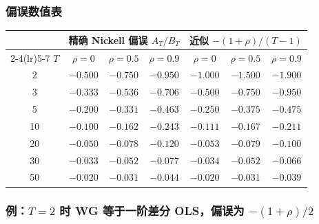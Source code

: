 \subsubsection{偏误数值表}

\begin{center}
\begin{minipage}{\linewidth}\centering\small
{}\label{tab:U12a-nickell}
\begin{tabular}{c@{\qquad}ccc@{\qquad}ccc}
\toprule
 & \multicolumn{3}{c}{精确 Nickell 偏误 $A_T/B_T$} & \multicolumn{3}{c}{近似 $-(1+\rho)/(T-1)$}\\
\cmidrule(lr){2-4}\cmidrule(lr){5-7}
$T$ & $\rho=0$ & $\rho=0.5$ & $\rho=0.9$ & $\rho=0$ & $\rho=0.5$ & $\rho=0.9$\\
\midrule
2  & $-0.500$ & $-0.750$ & $-0.950$ & $-1.000$ & $-1.500$ & $-1.900$\\
3  & $-0.333$ & $-0.536$ & $-0.706$ & $-0.500$ & $-0.750$ & $-0.950$\\
5  & $-0.200$ & $-0.331$ & $-0.463$ & $-0.250$ & $-0.375$ & $-0.475$\\
10 & $-0.100$ & $-0.162$ & $-0.243$ & $-0.111$ & $-0.167$ & $-0.211$\\
20 & $-0.050$ & $-0.078$ & $-0.120$ & $-0.053$ & $-0.079$ & $-0.100$\\
30 & $-0.033$ & $-0.052$ & $-0.077$ & $-0.034$ & $-0.052$ & $-0.066$\\
50 & $-0.020$ & $-0.031$ & $-0.044$ & $-0.020$ & $-0.031$ & $-0.039$\\
\bottomrule
\end{tabular}
\end{minipage}
\end{center}

\subsubsection{例：\texorpdfstring{$T=2$}{T=2} 时 WG 等于一阶差分 OLS，偏误为 \texorpdfstring{$-(1+\rho)/2$}{-(1+rho)/2}}

